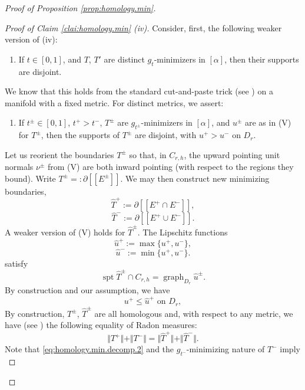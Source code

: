 \documentclass[11pt, letterpaper, reqno]{amsart}
\numberwithin{equation}{section}
\theoremstyle{remark}
\newcommand{\spt}{\operatorname{spt}}
\newcommand{\graph}{\operatorname{graph}}
\newcommand{\llbracket}{[\![}
\newcommand{\rrbracket}{]\!]}
\begin{document}
\begin{proof}[Proof of Proposition \ref{prop:homology.min}]
	\begin{proof}[Proof of Claim \ref{clai:homology.min} (iv)]
		Consider, first, the following weaker version of (iv):
		\begin{enumerate}
			\item[(iv')] If $t \in [0,1]$, and $T$, $T'$ are distinct $g_t$-minimizers in $[\alpha]$, then their supports are disjoint.
		\end{enumerate}
		We know that this holds from the standard cut-and-paste trick (see \cite[Lemma 2.8]{CMS:generic.9.10}) on a manifold with a fixed metric. For distinct metrics, we assert:
		\begin{enumerate}
			\item[(iv'')] If $t^\pm \in [0,1]$, $t^+ > t^-$, $T^\pm$ are $g_{t^\pm}$-minimizers in $[\alpha]$, and $u^\pm$ are as in (V) for $T^\pm$, then the supports of $T^\pm$ are disjoint, with $u^+ > u^-$ on $D_r$.
		\end{enumerate}
		Let us reorient the boundaries $T^\pm$ so that, in $C_{r,h}$, the upward pointing unit normals $\nu^\pm$ from (V) are both inward pointing (with respect to the regions they bound). Write $T^\pm =: \partial \llbracket E^\pm \rrbracket$. We may then construct new minimizing boundaries,
		\[ \hat T^+ := \partial \llbracket E^+ \cap E^- \rrbracket, \]
		\[ \hat T^- := \partial \llbracket E^+ \cup E^- \rrbracket. \]
		A weaker version of (V) holds for $\hat T^\pm$. The Lipschitz functions
		\[ \hat u^+ := \max \{ u^+, u^- \}, \]
		\[ \hat u^- := \min \{ u^+, u^- \}. \]
		satisfy
		\begin{equation} \label{eq:homology.min.decomp.1}
			\spt \hat T^\pm \cap C_{r,h} = \graph_{D_r} \hat u^\pm. 
		\end{equation}
		  By construction and our assumption, we have
		\begin{equation}
			u^+ \leq \hat u^+ \text{ on } D_r, 
		\end{equation}
		By construction, $T^\pm$, $\hat T^\pm$ are all homologous and, with respect to any metric, we have (see \cite[Decomposition Theorem]{White:boundary-regularity-multiplicity}) the following equality of Radon measures:
		\begin{equation} \label{eq:homology.min.decomp.2}
			\Vert T^+ \Vert + \Vert T^- \Vert = \Vert \hat T^+ \Vert + \Vert \hat T^- \Vert.
		\end{equation}
        		Note that \eqref{eq:homology.min.decomp.2} and the $g_{t^-}$-minimizing nature of $T^-$ imply
		\begin{equation} \label{eq:homology.min.area.1}

\end{equation}
\end{proof}
\end{proof}
\end{document}
